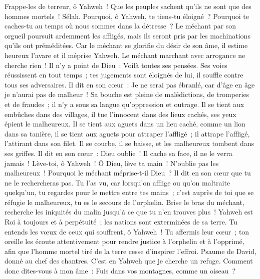 \begin{multicols}{2}
Frappe-les de terreur, ô Yahweh~! Que les peuples sachent qu'ils ne sont que des hommes mortels~! Sélah.
\VerseOne{}Pourquoi, ô Yahweh, te tiens-tu éloigné~? Pourquoi te caches-tu au temps où nous sommes dans la détresse~?
Le méchant par son orgueil poursuit ardemment les affligés, mais ils seront pris par les machinations qu'ils ont préméditées.
Car le méchant se glorifie du désir de son âme, il estime heureux l'avare et il méprise Yahweh.
Le méchant marchant avec arrogance ne cherche rien~! Il n'y a point de Dieu~: Voilà toutes ses pensées.
Ses voies réussissent en tout temps~; tes jugements sont éloignés de lui, il souffle contre tous ses adversaires.
Il dit en son cœur~: Je ne serai pas ébranlé, car d'âge en âge je n'aurai pas de malheur~!
Sa bouche est pleine de malédictions, de tromperies et de fraudes~; il n'y a sous sa langue qu'oppression et outrage.
Il se tient aux embûches dans des villages, il tue l'innocent dans des lieux cachés, ses yeux épient le malheureux.
Il se tient aux aguets dans un lieu caché, comme un lion dans sa tanière, il se tient aux aguets pour attraper l'affligé~; il attrape l'affligé, l'attirant dans son filet.
Il se courbe, il se baisse, et les malheureux tombent dans ses griffes.
Il dit en son cœur~: Dieu oublie~! Il cache sa face, il ne le verra jamais~!
Lève-toi, ô Yahweh~! Ô Dieu, lève ta main~! N'oublie pas les malheureux~!
Pourquoi le méchant méprise-t-il Dieu~? Il dit en son cœur que tu ne le rechercheras pas.
Tu l'as vu, car lorsqu'on afflige ou qu'on maltraite quelqu'un, tu regardes pour le mettre entre tes mains~; c'est auprès de toi que se réfugie le malheureux, tu es le secours de l'orphelin.
Brise le bras du méchant, recherche les iniquités du malin jusqu'à ce que tu n'en trouves plus~!
Yahweh est Roi à toujours et à perpétuité~; les nations sont exterminées de sa terre.
Tu entends les vœux de ceux qui souffrent, ô Yahweh~! Tu affermis leur cœur~; ton oreille les écoute attentivement
pour rendre justice à l'orphelin et à l'opprimé, afin que l'homme mortel tiré de la terre cesse d'inspirer l'effroi.
\VerseOne{}Psaume de David, donné au chef des chantres. C'est en Yahweh que je cherche un refuge. Comment donc dites-vous à mon âme~: Fuis dans vos montagnes, comme un oiseau~?

\end{multicols}
